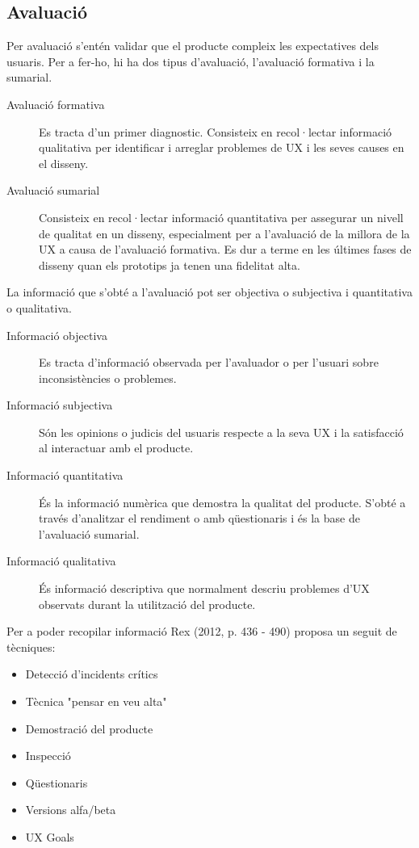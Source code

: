 \subsection{Avaluació}
Per avaluació s'entén validar que el producte compleix les expectatives dels usuaris. Per a fer-ho, hi ha dos tipus d'avaluació, l'avaluació formativa i la sumarial. 

\begin{description}
\item[Avaluació formativa] Es tracta d'un primer diagnostic. Consisteix en recol·lectar informació qualitativa per identificar i arreglar problemes de \ac{UX} i les seves causes en el disseny.
\item[Avaluació sumarial] Consisteix en recol·lectar informació quantitativa per assegurar un nivell de qualitat en un disseny, especialment per a l'avaluació de la millora de la \ac{UX} a causa de l'avaluació formativa. Es dur a terme en les últimes fases de disseny quan els prototips ja tenen una fidelitat alta. 
\end{description}

La informació que s'obté a l'avaluació pot ser objectiva o subjectiva i quantitativa o qualitativa.

\begin{description}
\item[Informació objectiva] Es tracta d'informació observada per l'avaluador o per l'usuari sobre inconsistències o problemes. 
\item[Informació subjectiva] Són les opinions o judicis del usuaris respecte a la seva \ac{UX} i la satisfacció al interactuar amb el producte. 
\item[Informació quantitativa] És la informació numèrica que demostra la qualitat del producte. S'obté a través d'analitzar el rendiment o amb qüestionaris i és la base de l'avaluació sumarial.
\item[Informació qualitativa] És informació descriptiva que normalment descriu problemes d'\ac{UX} observats durant la utilització del producte.
\end{description}

Per a poder recopilar informació Rex (2012, p. 436 - 490) \cite{UX_Book} proposa un seguit de tècniques:

\begin{itemize}
\item Detecció d'incidents crítics
\item Tècnica "pensar en veu alta"
\item Demostració del producte
\item Inspecció 
\item Qüestionaris
\item Versions alfa/beta
\item UX Goals %
\end{itemize}

